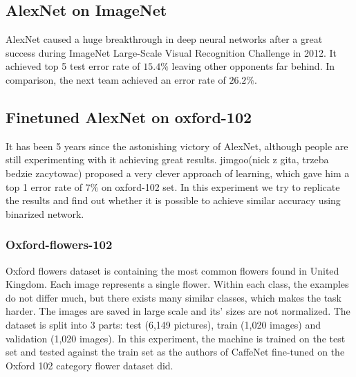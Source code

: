 \documentclass[licencjacka]{pracamgr}
\begin{document}
 	\subsection{AlexNet on ImageNet}
 	AlexNet caused a huge breakthrough in deep neural networks after a great success during ImageNet Large-Scale Visual Recognition Challenge in 2012. It achieved top 5 test error rate of $15.4\%$ leaving other opponents far behind. In comparison, the next team achieved an error rate of $26.2\%$. 
 	\subsection{Finetuned AlexNet on oxford-102}
 	It has been 5 years since the astonishing victory of AlexNet, although people are still experimenting with it achieving great results. jimgoo(nick z gita, trzeba bedzie zacytowac) proposed a very clever approach of learning, which gave him a top 1 error rate of $7\%$ on oxford-102 set. In this experiment we try to replicate the results and find out whether it is possible to achieve similar accuracy using binarized network. 
 		\subsubsection{Oxford-flowers-102}
 			Oxford flowers dataset is containing the most common flowers found in United Kingdom. Each image represents a single flower. Within each class, the examples do not differ much, but there exists many similar classes, which makes the task harder. The images are saved in large scale and its’ sizes are not normalized. The dataset is split into 3 parts: test (6,149 pictures), train (1,020 images) and validation (1,020 images). In this experiment, the machine is trained on the test set and tested against the train set as the authors of CaffeNet fine-tuned on the Oxford 102 category flower dataset did.
\end{document}

